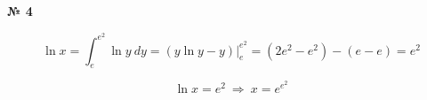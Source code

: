 \documentclass{article}
\begin{document}
\textbf{№ 4} 
\large

$$ \ln{x} = \int_{e}^{e^2} \ln{y} \ dy
= \left( y\ln{y} - y \right) \bigg\vert_{e}^{e^2}
= \left( 2e^2 - e^2 \right) - \left( e - e \right)
= e^2 $$

$$ \ln{x} = e^2 \ \Rightarrow \ x = e^{e^2}$$
\end{document}
